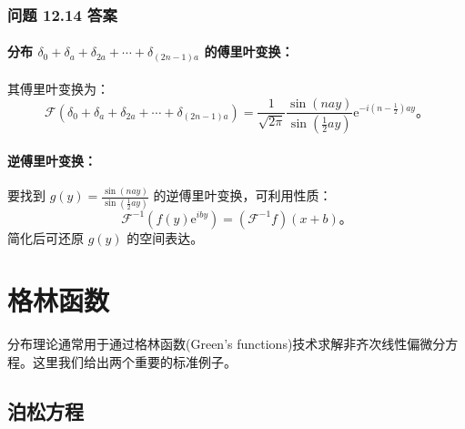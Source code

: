 \subsubsection{问题 12.14 答案}

\paragraph{\texorpdfstring{分布
$\delta_{0} + \delta_{a} + \delta_{2a} + \cdots + \delta_{(2n-1)a}$
的傅里叶变换：}{分布 \textbackslash delta\_\{0\} + \textbackslash delta\_\{a\} + \textbackslash delta\_\{2a\} + \textbackslash cdots + \textbackslash delta\_\{(2n-1)a\} 的傅里叶变换：}}

其傅里叶变换为：
 $$
\mathcal{F}\left(\delta_{0} + \delta_{a} + \delta_{2a} + \cdots + \delta_{(2n-1)a}\right) = \frac{1}{\sqrt{2 \pi}} \frac{\sin(n a y)}{\sin(\frac{1}{2} a y)} \mathrm{e}^{-i(n-\frac{1}{2}) a y}。
$$
\paragraph{逆傅里叶变换：}
要找到 $g(y) = \frac{\sin(n a y)}{\sin(\frac{1}{2} a y)}$
的逆傅里叶变换，可利用性质：
 $$
\mathcal{F}^{-1}\left(f(y) \mathrm{e}^{i b y}\right) = \left(\mathcal{F}^{-1}f\right)(x+b)。
$$
简化后可还原 $g(y)$ 的空间表达。

\section{格林函数}\label{sec:12.4}

分布理论通常用于通过格林函数(Green's
functions)技术求解非齐次线性偏微分方程。这里我们给出两个重要的标准例子。

\subsection{泊松方程}

